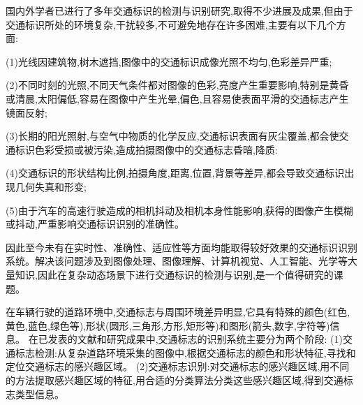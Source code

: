 \documentclass{amsart}
\begin{document}
国内外学者已进行了多年交通标识的检测与识别研究,取得不少进展及成果,但由于交通标识所处的环境复杂,干扰较多,不可避免地存在许多困难,主要有以下几个方面:

(1)光线因建筑物,树木遮挡,图像中的交通标识成像光照不均匀,色彩差异严重;

(2)不同时刻的光照,不同天气条件都对图像的色彩,亮度产生重要影响,特别是黄昏或清晨,太阳偏低,容易在图像中产生光晕,偏色,且容易使表面平滑的交通标志产生镜面反射;

(3)长期的阳光照射,与空气中物质的化学反应,交通标识表面有灰尘覆盖,都会使交通标识色彩受损或被污染,造成拍摄图像中的交通标志昏暗,降质:

(4)交通标识的形状结构比例,拍摄角度,距离,位置,背景等差异,都会导致交通标识出现几何失真和形变;

(5)由于汽车的高速行驶造成的相机抖动及相机本身性能影响,获得的图像产生模糊或抖动,严重影响交通标识识别的准确性。

因此至今未有在实时性、准确性、适应性等方面均能取得较好效果的交通标识识别系统。解决该问题涉及到图像处理、图像理解、计算机视觉、人工智能、光学等大量知识,因此在复杂动态场景下进行交通标识的检测与识别,是一个值得研究的课题。

在车辆行驶的道路环境中,交通标志与周围环境差异明显,它具有特殊的颜色(红色,黄色,蓝色,绿色等),形状(圆形,三角形,方形,矩形等)和图形(箭头,数字,字符等)信息。
在已发表的文献和研究成果中,交通标志的识别系统主要分为两个阶段:
(1)交通标志检测:从复杂道路环境采集的图像中,根据交通标志的颜色和形状特征,寻找和定位交通标志的感兴趣区域。
(2)交通标志识别:对交通标志的感兴趣区域,用不同的方法提取感兴趣区域的特征,用合适的分类算法分类这些感兴趣区域,得到交通标志类型信息。
\end{document}
